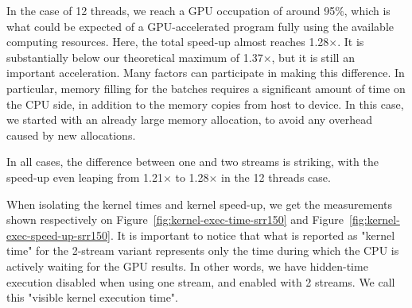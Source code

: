 In the case of 12 threads, we reach a GPU occupation of around 95\%, which is what could be expected of a GPU-accelerated program fully using the available computing resources. Here, the total speed-up almost reaches 1.28$\times$. It is substantially below our theoretical maximum of 1.37$\times$, but it is still an important acceleration. Many factors can participate in making this difference. In particular, memory filling for the batches requires a significant amount of time on the CPU side, in addition to the memory copies from host to device. In this case, we started with an already large memory allocation, to avoid any overhead caused by new allocations.

In all cases, the difference between one and two streams is striking, with the speed-up even leaping from 1.21$\times$ to 1.28$\times$ in the 12 threads case.

When isolating the kernel times and kernel speed-up, we get the measurements shown respectively on Figure~\ref{fig:kernel-exec-time-srr150} and Figure~\ref{fig:kernel-exec-speed-up-srr150}. It is important to notice that what is reported as "kernel time" for the 2-stream variant represents only the time during which the CPU is actively waiting for the GPU results. In other words, we have hidden-time execution disabled when using one stream, and enabled with 2 streams. We call this "visible kernel execution time".


